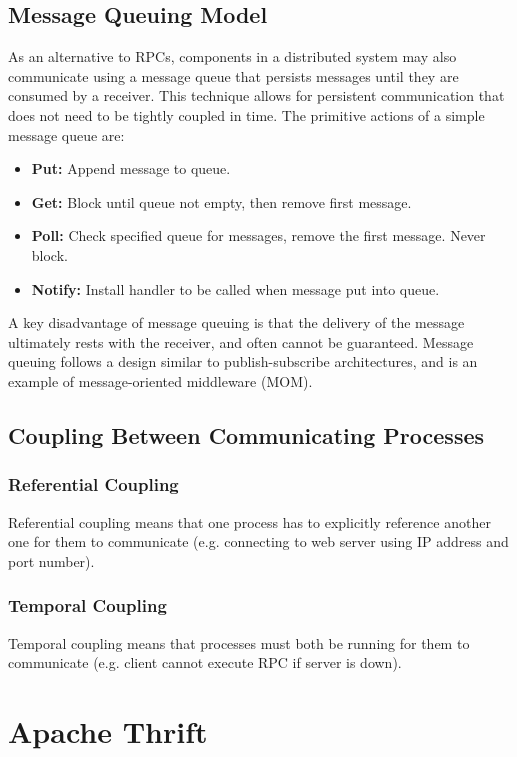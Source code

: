 \documentclass[12pt,titlepage]{article}
\begin{document}
    \subsection{Message Queuing Model} 
      As an alternative to RPCs, components in a distributed system may also communicate using a message queue that persists messages until they are consumed
      by a receiver. This technique allows for persistent communication that does not need to be tightly coupled in time. The primitive actions of a simple
      message queue are:
      \begin{itemize}
        \item \textbf{Put:} Append message to queue.
        \item \textbf{Get:} Block until queue not empty, then remove first message.
        \item \textbf{Poll:} Check specified queue for messages, remove the first message. Never block.
        \item \textbf{Notify:} Install handler to be called when message put into queue.
      \end{itemize}

      A key disadvantage of message queuing is that the delivery of the message ultimately rests with the receiver, and often cannot be guaranteed. Message
      queuing follows a design similar to publish-subscribe architectures, and is an example of message-oriented middleware (MOM).

    \subsection{Coupling Between Communicating Processes}
      \subsubsection{Referential Coupling}
        Referential coupling means that one process has to explicitly reference another one for them to communicate (e.g. connecting to web server using IP
        address and port number).
      \subsubsection{Temporal Coupling}
        Temporal coupling means that processes must both be running for them to communicate (e.g. client cannot execute RPC if server is down).

  \newpage

  \section{Apache Thrift}
\end{document}
